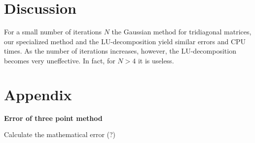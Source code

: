\documentclass[11pt]{article}
\begin{document}
\section*{Discussion}

\begin{flushleft}
For a small number of iterations $N$ the Gaussian method for tridiagonal matrices, our specialized method and the LU-decomposition yield similar errors and CPU times. As the number of iterations increases, however, the LU-decomposition becomes very uneffective. In fact, for $N>4$ it is useless.
\end{flushleft}


\nocite{*}

{}


\section*{Appendix}

\begin{flushleft}
\textbf{Error of three point method}

Calculate the mathematical error (?)
\end{flushleft}
\end{document}
